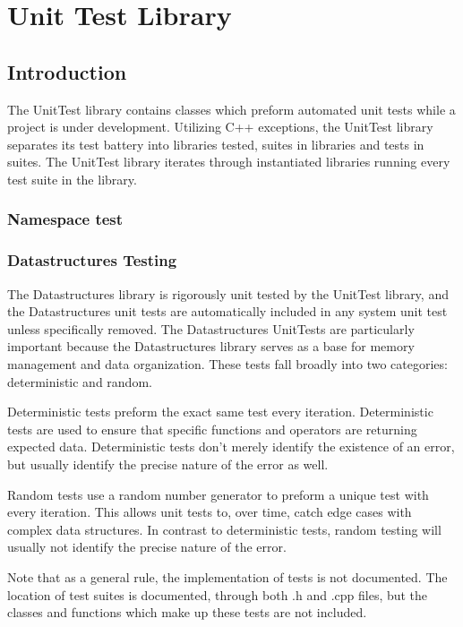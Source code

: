 \part{Unit Test Library} \label{sec:unit-test}

\chapter{Introduction}

The UnitTest library contains classes which preform automated unit tests while a project is under development.  Utilizing C++ exceptions, the UnitTest library separates its test battery into libraries tested, suites in libraries and tests in suites.  The UnitTest library iterates through instantiated libraries running every test suite in the library.

	\section{Namespace test}

	\section{Datastructures Testing} \label{subsec:datastructures-testing}
	
	The Datastructures library is rigorously unit tested by the UnitTest library, and the Datastructures unit tests are automatically included in any system unit test unless specifically removed.  The Datastructures UnitTests are particularly important because the Datastructures library serves as a base for memory management and data organization.  These tests fall broadly into two categories: deterministic and random.
	
	Deterministic tests preform the exact same test every iteration.  Deterministic tests are used to ensure that specific functions and operators are returning expected data.  Deterministic tests don't merely identify the existence of an error, but usually identify the precise nature of the error as well.
	
	Random tests use a random number generator to preform a unique test with every iteration.  This allows unit tests to, over time, catch edge cases with complex data structures.  In contrast to deterministic tests, random testing will usually not identify the precise nature of the error.

	Note that as a general rule, the implementation of tests is not documented.  The location of test suites is documented, through both .h and .cpp files, but the classes and functions which make up these tests are not included.

